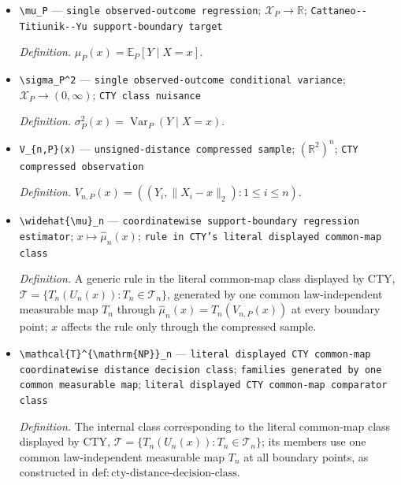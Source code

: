 \documentclass{article}
\begin{document}
\begin{itemize}
  \par\smallskip\noindent\emph{Definition.} \(a_n=(\log n/n)^{1/4}\).
  \item \texttt{\textbackslash{}\allowbreak{}mu\_\allowbreak{}P} --- \texttt{single observed-\allowbreak{}outcome regression}; \(\mathcal X_P\to\mathbb R\); \texttt{Cattaneo-\allowbreak{}-\allowbreak{}Titiunik-\allowbreak{}-\allowbreak{}Yu support-\allowbreak{}boundary target}
  \par\smallskip\noindent\emph{Definition.} \(\mu_P(x)=\mathbb E_P[Y\mid X=x]\).
  \item \texttt{\textbackslash{}\allowbreak{}sigma\_\allowbreak{}P\textasciicircum{}2} --- \texttt{single observed-\allowbreak{}outcome conditional variance}; \(\mathcal X_P\to(0,\infty)\); \texttt{CTY class nuisance}
  \par\smallskip\noindent\emph{Definition.} \(\sigma_P^2(x)=\operatorname{Var}_P(Y\mid X=x)\).
  \item \texttt{V\_\allowbreak{}\{n,\allowbreak{}P\}\allowbreak{}(x)} --- \texttt{unsigned-\allowbreak{}distance compressed sample}; \((\mathbb R^2)^n\); \texttt{CTY compressed observation}
  \par\smallskip\noindent\emph{Definition.} \(V_{n,P}(x)=((Y_i,\lVert X_i-x\rVert_2):1\leq i\leq n)\).
  \item \texttt{\textbackslash{}\allowbreak{}widehat\{\textbackslash{}\allowbreak{}mu\}\allowbreak{}\_\allowbreak{}n} --- \texttt{coordinatewise support-\allowbreak{}boundary regression estimator}; \(x\mapsto\widehat\mu_n(x)\); \texttt{rule in CTY's literal displayed common-\allowbreak{}map class}
  \par\smallskip\noindent\emph{Definition.} A generic rule in the literal common-map class displayed by CTY, \(\mathcal T=\{T_n(U_n(x)):T_n\in\mathcal T_n\}\), generated by one common law-independent measurable map \(T_n\) through \(\widehat\mu_n(x)=T_n(V_{n,P}(x))\) at every boundary point; \(x\) affects the rule only through the compressed sample.
  \item \texttt{\textbackslash{}\allowbreak{}mathcal\{T\}\allowbreak{}\textasciicircum{}\{\textbackslash{}\allowbreak{}mathrm\{NP\}\allowbreak{}\}\allowbreak{}\_\allowbreak{}n} --- \texttt{literal displayed CTY common-\allowbreak{}map coordinatewise distance decision class}; \texttt{families generated by one common measurable map}; \texttt{literal displayed CTY common-\allowbreak{}map comparator class}
  \par\smallskip\noindent\emph{Definition.} The internal class corresponding to the literal common-map class displayed by CTY, \(\mathcal T=\{T_n(U_n(x)):T_n\in\mathcal T_n\}\); its members use one common law-independent measurable map \(T_n\) at all boundary points, as constructed in \(\mathrm{def:cty\text{-}distance\text{-}decision\text{-}class}\).

\end{itemize}
\end{document}
